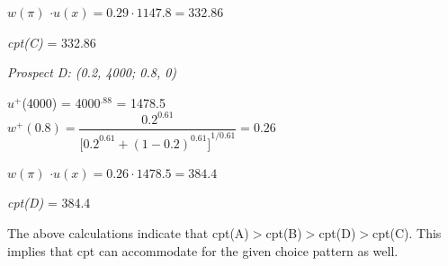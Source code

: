 \documentclass[12pt]{article}
\begin{document}
$w(\pi)$ $\cdot u(x) = 0.29 \cdot 1147.8=332.86$

\textit{ cpt(C)} = 332.86

\vspace{5mm}

\noindent \textit{Prospect D: (0.2, 4000; 0.8, 0)}

$u^{+}$(4000) = 4000${}^{.88}$ = 1478.5
\[w^+\left(0.8\right)=\frac{{0.2}^{0.61}}{{{[0.2}^{0.61}+{(1-0.2)}^{0.61}]}^{{1}/{0.61}}}=0.26\ \ \ \ \ \ \ \ \ \ \ \ \ \ \ \ \ \ \ \ \ \ \ \ \ \ \ \ \ \ \ \ \ \ \ \ \ \ \ \ \ \ \ \ \ \ \ \ \ \ \ \ \ \ \ \ \ \ \ \ \ \ \ \ \ \ \ \ \ \ \ \ \]

$w(\pi)$ $\cdot u(x) = 0.26 \cdot 1478.5=384.4$

\textit{ cpt(D)} = 384.4

\vspace{5mm}

\noindent The above calculations indicate that cpt(A)$>$cpt(B)$>$cpt(D)$>$cpt(C). This implies that cpt can accommodate for the given choice pattern as well.
\end{document}
